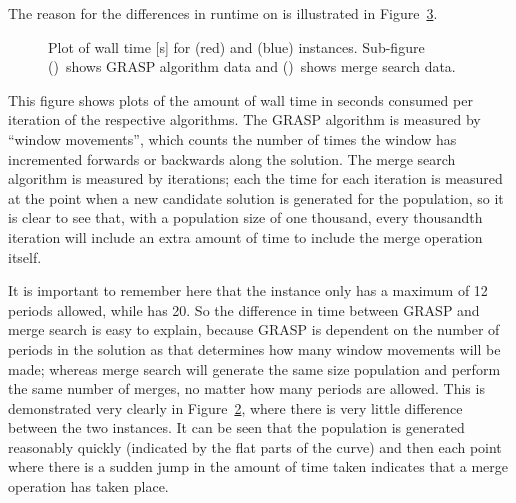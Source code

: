 \documentclass[journal]{IEEEtran}
\begin{document}
The reason for the differences in runtime on \dmine{} is illustrated in Figure~\ref{plot:mine:time}.
%
\begin{figure}[h!]
    \centering
    \begin{subfigure}[t]{0.4\textwidth}
    \centering
    \caption{}
    \label{plot:time.1}
    \end{subfigure}
    \quad
    \begin{subfigure}[t]{0.4\textwidth}
    \centering
    \caption{}
    \label{plot:time.2}
    \end{subfigure}
    \caption[Plot of wall time {[s]} for \zucksmall{} and \dmine{} instances]{Plot of wall time [s] for \zucksmall{} (red) and \dmine{} (blue) instances. Sub-figure ()~shows GRASP algorithm data and ()~shows merge search data.}
    \label{plot:mine:time}
\end{figure}
%
This figure shows plots of the amount of wall time in seconds consumed per iteration of the respective algorithms. The GRASP algorithm is measured by ``window movements'', which counts the number of times the window has incremented forwards or backwards along the solution. The merge search algorithm is measured by iterations; each the time for each iteration is measured at the point when a new candidate solution is generated for the population, so it is clear to see that, with a population size of one thousand, every thousandth iteration will include an extra amount of time to include the merge operation itself. 

It is important to remember here that the \dmine{} instance only has a maximum of 12 periods allowed, while \zucksmall{} has 20. So the difference in time between GRASP and merge search is easy to explain, because GRASP is dependent on the number of periods in the solution as that determines how many window movements will be made; whereas merge search will generate the same size population and perform the same number of merges, no matter how many periods are allowed. This is demonstrated very clearly in Figure~\ref{plot:time.2}, where there is very little difference between the two instances. It can be seen that the population is generated reasonably quickly (indicated by the flat parts of the curve) and then each point where there is a sudden jump in the amount of time taken indicates that a merge operation has taken place.
\end{document}
